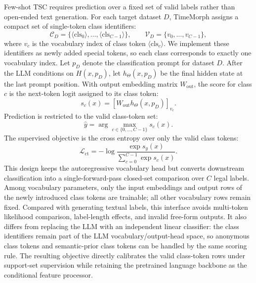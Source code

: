 \documentclass[10pt,journal,compsoc]{IEEEtran}
\begin{document}
Few-shot TSC requires prediction over a fixed set of valid labels rather than open-ended text generation.
For each target dataset $D$, TimeMorph assigns a compact set of single-token class identifiers:
\begin{equation}
\label{eq:class-token-set}
\mathcal{C}_D
=
\{
\langle \mathrm{cls}_0\rangle,\ldots,\langle \mathrm{cls}_{C-1}\rangle
\},
\qquad
\mathcal{V}_D
=
\{
v_0,\ldots,v_{C-1}
\},
\end{equation}
where $v_c$ is the vocabulary index of class token $\langle \mathrm{cls}_c\rangle$.
We implement these identifiers as newly added special tokens, so each class corresponds to exactly one vocabulary index.
Let $p_D$ denote the classification prompt for dataset $D$.
After the LLM conditions on $H(x,p_D)$, let $h_{\Theta}(x,p_D)$ be the final hidden state at the last prompt position.
With output embedding matrix $W_{\mathrm{out}}$, the score for class $c$ is the next-token logit assigned to its class token:
\begin{equation}
\label{eq:class-score}
s_c(x)
=
\left[
W_{\mathrm{out}}h_{\Theta}(x,p_D)
\right]_{v_c}.
\end{equation}
Prediction is restricted to the valid class-token set:
\begin{equation}
\label{eq:class-pred}
\hat{y}
=
\arg\max_{c\in\{0,\ldots,C-1\}} s_c(x).
\end{equation}
The supervised objective is the cross entropy over only the valid class tokens:
\begin{equation}
\label{eq:class-token-loss}
\mathcal{L}_{\mathrm{ct}}
=
-\log
\frac{\exp s_y(x)}
{\sum_{c=0}^{C-1}\exp s_c(x)}.
\end{equation}
This design keeps the autoregressive vocabulary head but converts downstream classification into a single-forward-pass closed-set comparison over $C$ legal labels.
Among vocabulary parameters, only the input embeddings and output rows of the newly introduced class tokens are trainable; all other vocabulary rows remain fixed.
Compared with generating textual labels, this interface avoids multi-token likelihood comparison, label-length effects, and invalid free-form outputs.
It also differs from replacing the LLM with an independent linear classifier: the class identifiers remain part of the LLM vocabulary/output-head space, so anonymous class tokens and semantic-prior class tokens can be handled by the same scoring rule.
The resulting objective directly calibrates the valid class-token rows under support-set supervision while retaining the pretrained language backbone as the conditional feature processor.
\end{document}
